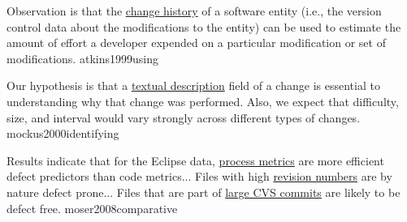 \documentclass{article}
\begin{document}
  {Observation is that the \ul{change history} of a software entity (i.e., the version control data about the modifications to the entity) can be used to estimate the amount of effort a developer expended on a particular modification or set of modifications.}
  {atkins1999using}

  {Our hypothesis is that a \ul{textual description} field of a change is essential to understanding why that change was performed. Also, we expect that difficulty, size, and interval would vary strongly across different types of changes.}
  {mockus2000identifying}


  {Results indicate that for the Eclipse data, \ul{process metrics} are more efficient defect predictors than code metrics... Files with high \ul{revision numbers} are by nature defect prone... Files that are part of \ul{large CVS commits} are likely to be defect free.}
  {moser2008comparative}
\end{document}
